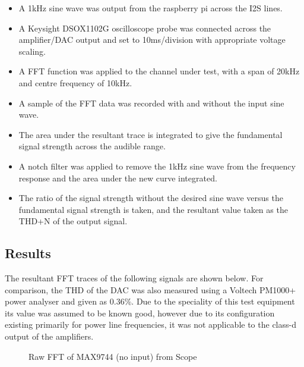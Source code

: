 \documentclass[main.tex]{subfiles}
\begin{document}
\begin{itemize}
    \item A 1kHz sine wave was output from the raspberry pi across the I2S lines.
    \item A Keysight DSOX1102G oscilloscope probe was connected across the amplifier/DAC output and set to 10ms/division with appropriate voltage scaling.
	\item A FFT function was applied to the channel under test, with a span of 20kHz and centre frequency of 10kHz.
	\item A sample of the FFT data was recorded with and without the input sine wave.
	\item The area under the resultant trace is integrated to give the fundamental signal strength across the audible range.
	\item A notch filter was applied to remove the 1kHz sine wave from the frequency response and the area under the new curve integrated.
	\item The ratio of the signal strength without the desired sine wave versus the fundamental signal strength is taken, and the resultant value taken as the THD+N of the output signal.
\end{itemize}


\subsection{Results}

The resultant FFT traces of the following signals are shown below. For comparison, the THD of the DAC was also measured using a Voltech PM1000+ power analyser and given as 0.36\%. Due to the speciality of this test equipment its value was assumed to be known good, however due to its configuration existing primarily for power line frequencies, it was not applicable to the class-d output of the amplifiers.

\begin{figure}[H]
    \caption{Raw FFT of MAX9744 (no input) from Scope}
    \label{fig:lowpass-fft}
\end{figure}
\end{document}
